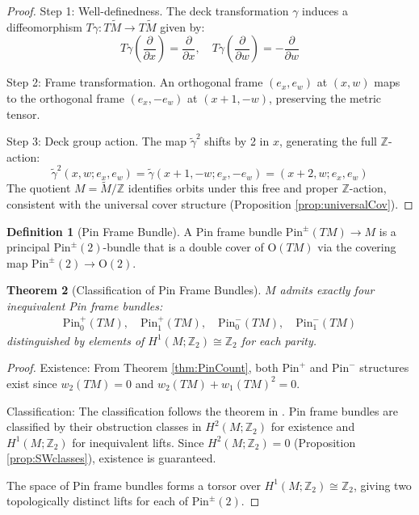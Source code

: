 \documentclass[11pt]{amsart}
\newtheorem{theorem}{Theorem}[section]
\theoremstyle{definition}
\newtheorem{definition}[theorem]{Definition}
\theoremstyle{remark}
\newcommand{\ZZ}{\mathbb{Z}}
\newcommand{\wt}{\widetilde}
\begin{document}
\begin{proof}
Step 1: Well-definedness. The deck transformation $\gamma$ induces a diffeomorphism $T\gamma: T\wt{M} \to T\wt{M}$ given by:
\[
T\gamma \left(\frac{\partial}{\partial x}\right) = \frac{\partial}{\partial x}, \quad 
T\gamma \left(\frac{\partial}{\partial w}\right) = -\frac{\partial}{\partial w}
\]

Step 2: Frame transformation. An orthogonal frame $(e_x, e_w)$ at $(x,w)$ maps to the orthogonal frame $(e_x, -e_w)$ at $(x+1,-w)$, preserving the metric tensor.

Step 3: Deck group action. The map $\widetilde{\gamma}^2$ shifts by 2 in $x$, generating the full $\ZZ$-action:
\[
\widetilde{\gamma}^2(x,w; e_x, e_w) = \widetilde{\gamma}(x+1,-w; e_x, -e_w) = (x+2,w; e_x, e_w)
\]
The quotient $M = \wt{M}/\ZZ$ identifies orbits under this free and proper $\ZZ$-action, consistent with the universal cover structure (Proposition \ref{prop:universalCov}).
\end{proof}

\begin{definition}[Pin Frame Bundle]\label{def:pin-frame-bundle}
A Pin frame bundle $\mathrm{Pin}^{\pm}(TM) \to M$ is a principal $\mathrm{Pin}^{\pm}(2)$-bundle that is a double cover of $\mathrm{O}(TM)$ via the covering map $\mathrm{Pin}^{\pm}(2) \to \mathrm{O}(2)$.
\end{definition}

\begin{theorem}[Classification of Pin Frame Bundles]\label{thm:pin-frame-classification}
$M$ admits exactly four inequivalent Pin frame bundles:
\begin{align}
\mathrm{Pin}^+_0(TM), \quad \mathrm{Pin}^+_1(TM), \quad \mathrm{Pin}^-_0(TM), \quad \mathrm{Pin}^-_1(TM)
\end{align}
distinguished by elements of $H^1(M; \ZZ_2) \cong \ZZ_2$ for each parity.
\end{theorem}

\begin{proof}
Existence: From Theorem \ref{thm:PinCount}, both $\mathrm{Pin}^+$ and $\mathrm{Pin}^-$ structures exist since $w_2(TM) = 0$ and $w_2(TM) + w_1(TM)^2 = 0$.

Classification: The classification follows the theorem in \cite[Chapter II, Theorem 1.13]{LawsonMichelsohn1989}. Pin frame bundles are classified by their obstruction classes in $H^2(M; \ZZ_2)$ for existence and $H^1(M; \ZZ_2)$ for inequivalent lifts. Since $H^2(M; \ZZ_2) = 0$ (Proposition \ref{prop:SWclasses}), existence is guaranteed.

The space of Pin frame bundles forms a torsor over $H^1(M; \ZZ_2) \cong \ZZ_2$, giving two topologically distinct lifts for each of $\mathrm{Pin}^{\pm}(2)$.
\end{proof}
\end{document}
